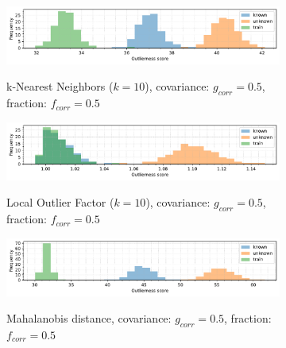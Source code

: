 \begin{figure}[t]
    \centering
    \begin{subfigure}[b]{\textwidth}
        \centering
        \caption{\small k-Nearest Neighbors ($k=10$), covariance: $g_{corr} = 0.5$, fraction: $f_{corr} = 0.5$}
        \includegraphics[width=\textwidth]{images/correlations/hists-extreme/hist-correlations-n_correlated_0.50-covariance_0.50-distance_8-outliers_correlated_False-model_kNN-10-seed_0.pdf}
        \label{fig:hists-correlations-extreme-knn}
    \end{subfigure}
    \begin{subfigure}[b]{\textwidth}
        \centering
        \caption{\small Local Outlier Factor ($k=10$), covariance: $g_{corr} = 0.5$, fraction: $f_{corr} = 0.5$}
        \includegraphics[width=\textwidth]{images/correlations/hists-extreme/hist-correlations-n_correlated_0.50-covariance_0.50-distance_8-outliers_correlated_False-model_LOF-10-seed_0.pdf}
        \label{fig:hists-correlations-extreme-lof}
    \end{subfigure}
    \begin{subfigure}[b]{\textwidth}
        \centering
        \caption{\small Mahalanobis distance, covariance: $g_{corr} = 0.5$, fraction: $f_{corr} = 0.5$}
        \includegraphics[width=\textwidth]{images/correlations/hists-extreme/hist-correlations-n_correlated_0.50-covariance_0.50-distance_8-outliers_correlated_False-model_MD-seed_0.pdf}
        \label{fig:hists-correlations-extreme-md}
    \end{subfigure}
    \begin{subfigure}[b]{\textwidth}

\end{subfigure}
\end{figure}
